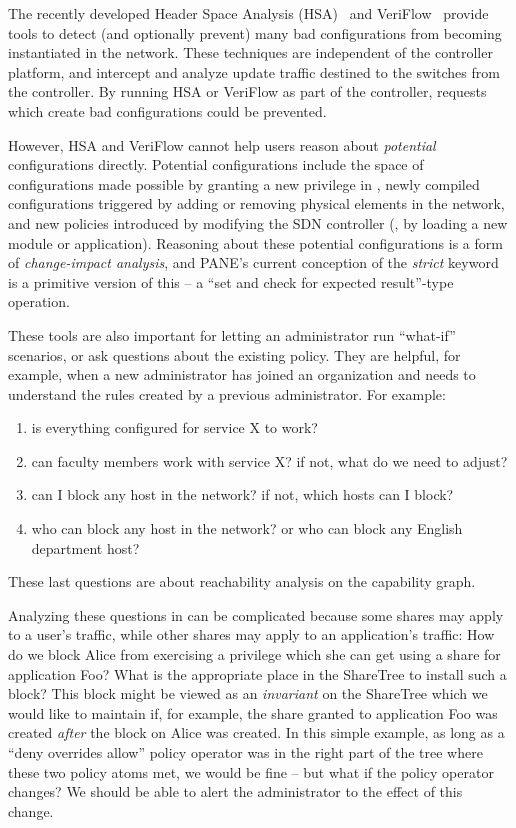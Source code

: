 The recently developed Header Space Analysis (HSA)~\cite{HSA} and
VeriFlow~\cite{VeriFlow} provide tools to detect (and optionally prevent) many bad
configurations from becoming instantiated in the network. These techniques are
independent of the controller platform, and intercept and analyze update traffic
destined to the switches from the controller. By running HSA or VeriFlow as part
of the \sys controller, requests which create bad configurations could be prevented.

However, HSA and VeriFlow cannot help users reason about \emph{potential}
configurations directly. Potential configurations include the space of configurations
made possible by granting a new privilege in \sys, newly compiled configurations
triggered by adding or removing physical elements in the network, and new
policies introduced by modifying the SDN controller (\eg, by loading a new module
or application). Reasoning about these potential configurations is a form
of \emph{change-impact analysis}, and PANE's current conception of the
\emph{strict} keyword is a primitive version of  this -- a
``set and check for expected result''-type operation.

These tools are also important for letting an administrator run ``what-if'' scenarios, 
or ask questions about the existing policy. They are helpful, for example, when 
a new administrator has joined an organization and needs to understand the 
rules created by a previous administrator. For example:

{\singlespacing
\begin{enumerate}
\item is everything configured for service X to work? 
\item can faculty members work with service X? if not, what do we need to adjust?
\item can I block any host in the network? if not, which hosts can I block?
\item who can block any host in the network? or who can block any English 
department host?
\end{enumerate}
}

These last questions are about reachability analysis on the capability graph.

Analyzing these questions in \sys can be complicated because some shares 
may apply to a user's traffic, while other shares may apply to an application's 
traffic: How do we block Alice from exercising a privilege which she can get using 
a share for application Foo? What is the appropriate place in the ShareTree to install such 
a block? This block might be viewed as an \emph{invariant} on the ShareTree which we 
would like to maintain if, for example, the share granted to application Foo 
was created \emph{after} the block on Alice was created. In this simple example, 
as long as a ``deny overrides allow'' policy operator was in the right part of 
the tree where these two policy atoms met, we would be fine -- but what if the 
policy operator changes? We should be able to alert the administrator to the 
effect of this change.

